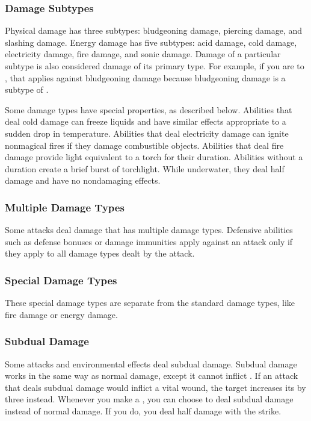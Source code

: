             \subsubsection{Damage Subtypes}\label{Damage Subtypes}
                Physical damage has three subtypes: bludgeoning damage, piercing damage, and slashing damage.
                Energy damage has five subtypes: acid damage, cold damage, electricity damage, fire damage, and sonic damage.
                Damage of a particular subtype is also considered damage of its primary type.
                For example, if you are  to , that applies against bludgeoning damage because bludgeoning damage is a subtype of .

                Some damage types have special properties, as described below.
                 Abilities that deal cold damage can freeze liquids and have similar effects appropriate to a sudden drop in temperature.
                 Abilities that deal electricity damage can ignite nonmagical fires if they damage combustible objects.
                 Abilities that deal fire damage provide light equivalent to a torch for their duration.
                Abilities without a duration create a brief burst of torchlight.
                While underwater, they deal half damage and have no nondamaging effects.

            \subsubsection{Multiple Damage Types}\label{Multiple Damage Types}
                Some attacks deal damage that has multiple damage types.
                Defensive abilities such as defense bonuses or damage immunities apply against an attack only if they apply to all damage types dealt by the attack.

        \subsubsection{Special Damage Types}\label{Special Damage Types}

            These special damage types are separate from the standard damage types, like fire damage or energy damage.

            \subsubsection{Subdual Damage}\label{Subdual Damage}
                Some attacks and environmental effects deal subdual damage.
                Subdual damage works in the same way as normal damage, except it cannot inflict .
                If an attack that deals subdual damage would inflict a vital wound, the target increases its  by three instead.
                Whenever you make a , you can choose to deal subdual damage instead of normal damage.
                If you do, you deal half damage with the strike.

